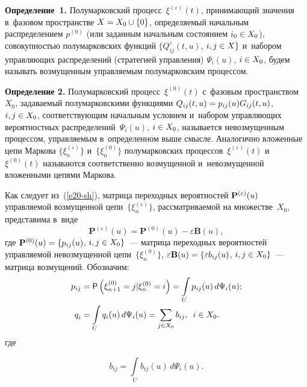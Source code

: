 \begin{multicols}{2}
\noindent
\textbf{Определение~1.} Полумарковский процесс~$\xi ^{(\varepsilon )} (t)$, 
принимающий значения в~фазовом пространстве  $X\hm=X_{0} \cup \{0\}$, опре\-де\-ля\-емый 
начальным распределением $p^{(0)}$ (или заданным начальным состоянием $i_0\hm\in 
X_0$), совокупностью полумарковских функций $\{Q_{ij}^{\varepsilon } (t,u)$, $i,j 
\hm\in X\}$ и~набором управ\-ля\-ющих распределений (стратегией управ\-ле\-ния) 
$\Psi_{i}(u)$, $i\hm\in X_0$, будем называть возмущенным управ\-ля\-емым полумарковским 
процессом.

\smallskip

\noindent
\textbf{Определение 2.} Полумарковский процесс~$\xi^{(0)} (t)$ с~фазовым 
пространством~$X_{0}$, за\-да\-ва\-емый полумарковскими функциями $Q_{ij} (t,u)\hm=p_{ij} 
(u)G_{ij} (t,u)$, $i,j \hm\in X_{0}$, соответствующим начальным условием 
и~набором управ\-ля\-ющих вероятностных распределений~$\Psi_{i}(u)$, $i\hm\in X_{0} $, 
называется  невозмущенным  процессом, управ\-ля\-емым в~определенном выше смысле. 
Аналогично вложенные цепи Маркова $\{\xi_{n}^{(\varepsilon )} \}$ и~$\{\xi _{n}^{(0)} \}$ 
полумарковских процессов~$\xi ^{(\varepsilon )} (t)$ и~$\xi ^{(0)} (t)$ 
называются соответственно возмущенной и~невозмущенной вложенными 
цепями Маркова.

\smallskip

Как следует из~(\ref{e20-sh}), матрица переходных вероятностей ${\bf P}^{(\varepsilon )} 
(u)$ управ\-ля\-емой возмущенной цепи~$\{\xi _{n}^{(\varepsilon )} \}$, 
рас\-смат\-ри\-ва\-емой на множестве~$X_{0} $, представима в~виде
\begin{equation}
\mathbf{P}^{(\varepsilon )} (u)=\mathbf{P}^{(0)} (u)-\varepsilon \mathbf{B}(u), 
\label{e21-sh}
\end{equation}
где ${\bf P}^{(0)} (u)=\{p_{ij} (u)$, $i,j\hm\in X_{0} \}$~--- матрица 
переходных вероятностей управ\-ля\-емой невозмущенной цепи~$\{\xi_{n}^{(0)} \}$, 
$\varepsilon \mathbf{B}(u) \hm=\{\varepsilon b_{ij} (u)$, $i,j\hm\in X_{0} \}$~--- 
мат\-ри\-ца возмущений. Обозначим:
\begin{align}
p_{ij}&=\mathsf{P}\left(\xi_{n+1}^{(0)} =j |\xi_{n}^{(0)} =i\right)=\int\limits_{U}p_{ij}(u) \,
d\Psi_{i} (u);\label{e22-sh}\\
q_{i}^{}  &=\int\limits_{U}q_{i} (u)\,d\Psi_{i} (u) =\sum\limits_{j\in X_0} b_{ij},\enskip i\in X_{0}. \label{e23-sh}
\end{align}
где

\noindent
$$
b_{ij} =\int\limits_{U}b_{ij} (u)\,d\Psi_{i} (u).
$$



\end{multicols}
